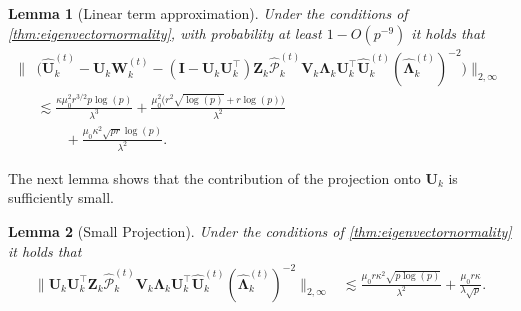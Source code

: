 \documentclass[10pt]{article}
\newcommand{\0}{{\mathbf{0}}}
\newcommand{\1}{{\mathbf{1}}}
\newcommand{\U}{{\mathbf{U}}}
\renewcommand{\t}{^{\top}}
\newcommand{\uhat}{\mathbf{\hat{U}}}
\newtheorem{lemma}{Lemma}
\newcommand{\inv}{^{-1}}
\renewcommand{\hat}{\widehat}
\renewcommand{\hat}{\widehat}
\begin{document}
 
 
 
 
 
\begin{lemma}[Linear term approximation] \label{lem:linearapprox}
Under the conditions of \cref{thm:eigenvectornormality}, with probability at least $1 - O(p^{-9})$ it holds that
\begin{align*}
    \bigg\|&\bigg(\uhat_k^{(t)} - \U_k \mathbf{W}_k^{(t)}  - (\mathbf{I} - \U_k \U_k\t) \mathbf{Z}_k \mathcal{\hat P}^{(t)}_k \mathbf{V}_k \mathbf{\Lambda}_k \U_k\t \uhat_k^{(t)}(\mathbf{\hat \Lambda}_k^{(t)})^{-2} \bigg)\bigg\|_{2,\infty} \\
    &\lesssim  \frac{\kappa \mu_0^2 r^{3/2} p \log(p)}{\lambda^3} + \frac{\mu_0^2 \big(r^2 \sqrt{\log(p)} + r \log(p) \big)}{\lambda^2}\\
    &\qquad +  \frac{\mu_0 \kappa^2 \sqrt{pr} \log(p)}{\lambda^2}.
\end{align*}
\end{lemma}


\noindent The next lemma shows that the contribution of the projection onto $\U_k$ is sufficiently small.
\begin{lemma}[Small Projection] \label{uperplemma}
Under the conditions of \cref{thm:eigenvectornormality} it holds that
\begin{align*}
    \| \U_k \U_k\t \mathbf{Z}_k \mathcal{\hat P}_k^{(t)} \mathbf{V}_k \mathbf{\Lambda}_k \U_k\t \uhat_k^{(t)} ( \mathbf{\hat \Lambda}_k^{(t)})^{-2} \|_{2,\infty} &\lesssim \frac{\mu_0 r \kappa^2 \sqrt{p\log(p)}}{\lambda^2} + \frac{\mu_0 r \kappa}{\lambda \sqrt{p}}.
\end{align*}

\end{lemma}
\end{document}
